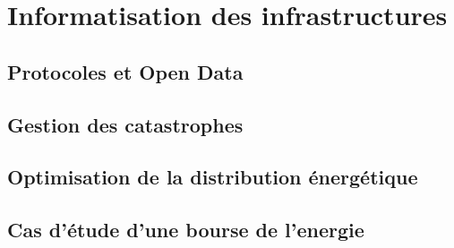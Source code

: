 \chapter{Informatisation des infrastructures}
\section{Protocoles et Open Data}
\lipsum
\section{Gestion des catastrophes}
\lipsum
\section{Optimisation de la distribution énergétique}
\lipsum
\section{Cas d'étude d'une bourse de l'energie}
\lipsum
